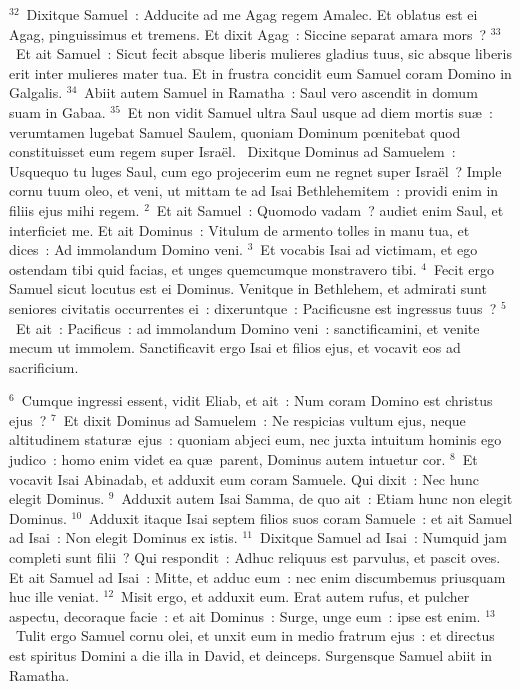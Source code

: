 ${}^{32}$~Dixitque Samuel~: Adducite ad me Agag regem Amalec. Et oblatus est ei Agag, pinguissimus et tremens. Et dixit Agag~: Siccine separat amara mors~?
${}^{33}$~Et ait Samuel~: Sicut fecit absque liberis mulieres gladius tuus, sic absque liberis erit inter mulieres mater tua. Et in frustra concidit eum Samuel coram Domino in Galgalis.
${}^{34}$~Abiit autem Samuel in Ramatha~: Saul vero ascendit in domum suam in Gabaa.
${}^{35}$~Et non vidit Samuel ultra Saul usque ad diem mortis su\ae~: verumtamen lugebat Samuel Saulem, quoniam Dominum pœnitebat quod constituisset eum regem super Isra\"el.
~\lettrine[lines=10,image=true,loversize=0.05,lraise=-0.03]{D}{}ixitque Dominus ad Samuelem~: Usquequo tu luges Saul, cum ego projecerim eum ne regnet super Isra\"el~? Imple cornu tuum oleo, et veni, ut mittam te ad Isai Bethlehemitem~: providi enim in filiis ejus mihi regem.
${}^{2}$~Et ait Samuel~: Quomodo vadam~? audiet enim Saul, et interficiet me. Et ait Dominus~: Vitulum de armento tolles in manu tua, et dices~: Ad immolandum Domino veni.
${}^{3}$~Et vocabis Isai ad victimam, et ego ostendam tibi quid facias, et unges quemcumque monstravero tibi.
${}^{4}$~Fecit ergo Samuel sicut locutus est ei Dominus. Venitque in Bethlehem, et admirati sunt seniores civitatis occurrentes ei~: dixeruntque~: Pacificusne est ingressus tuus~?
${}^{5}$~Et ait~: Pacificus~: ad immolandum Domino veni~: sanctificamini, et venite mecum ut immolem. Sanctificavit ergo Isai et filios ejus, et vocavit eos ad sacrificium.


${}^{6}$~Cumque ingressi essent, vidit Eliab, et ait~: Num coram Domino est christus ejus~?
${}^{7}$~Et dixit Dominus ad Samuelem~: Ne respicias vultum ejus, neque altitudinem statur\ae\ ejus~: quoniam abjeci eum, nec juxta intuitum hominis ego judico~: homo enim videt ea qu\ae\ parent, Dominus autem intuetur cor.
${}^{8}$~Et vocavit Isai Abinadab, et adduxit eum coram Samuele. Qui dixit~: Nec hunc elegit Dominus.
${}^{9}$~Adduxit autem Isai Samma, de quo ait~: Etiam hunc non elegit Dominus.
${}^{10}$~Adduxit itaque Isai septem filios suos coram Samuele~: et ait Samuel ad Isai~: Non elegit Dominus ex istis.
${}^{11}$~Dixitque Samuel ad Isai~: Numquid jam completi sunt filii~? Qui respondit~: Adhuc reliquus est parvulus, et pascit oves. Et ait Samuel ad Isai~: Mitte, et adduc eum~: nec enim discumbemus priusquam huc ille veniat.
${}^{12}$~Misit ergo, et adduxit eum. Erat autem rufus, et pulcher aspectu, decoraque facie~: et ait Dominus~: Surge, unge eum~: ipse est enim.
${}^{13}$~Tulit ergo Samuel cornu olei, et unxit eum in medio fratrum ejus~: et directus est spiritus Domini a die illa in David, et deinceps. Surgensque Samuel abiit in Ramatha.


